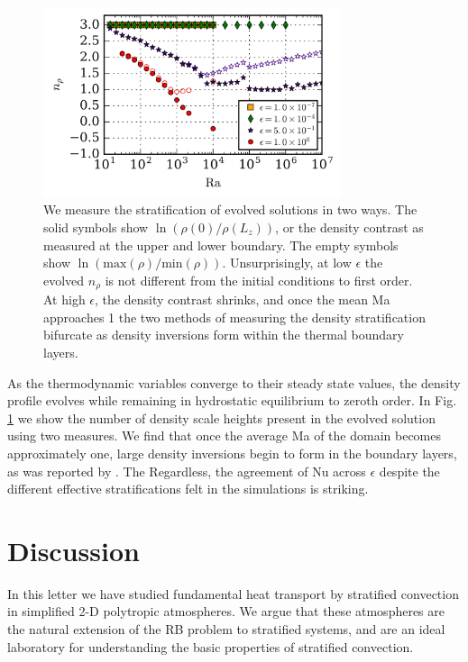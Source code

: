 \documentclass[aps, prl, twocolumn, nofootinbib, groupedaddress, amsfonts, amssymb, amsmath]{revtex4-1}
\begin{document}
\begin{figure}[t]
\includegraphics[width=3.4375in]{./figs/density_v_ra.png}
\caption{\label{fig:nrho_v_ra} We measure the stratification of evolved solutions
in two ways.  The solid symbols show $\ln(\rho(0)/\rho(L_z))$, or the density contrast
as measured at the upper and lower boundary.  The empty symbols show 
$\ln(\text{max}(\rho)/\text{min}(\rho))$. Unsurprisingly, at low $\epsilon$ the evolved
$n_{\rho}$ is not different from the initial conditions to first order.  At high $\epsilon$,
the density contrast shrinks, and once the mean Ma approaches 1 the two methods of
measuring the density stratification bifurcate as density inversions form within the thermal
boundary layers.}
\end{figure}

As the thermodynamic variables converge to their steady state values, the density
profile evolves while remaining in hydrostatic equilibrium to zeroth order.  In 
Fig. \ref{fig:nrho_v_ra} we show the number of density scale heights present in the
evolved solution using two measures.  We find that once the average Ma of the domain
becomes approximately one, large density inversions begin to form in the boundary layers,
as was reported by \cite{brandenburg&all2005}.  The Regardless, the agreement of Nu
across $\epsilon$ despite the different effective stratifications felt in the simulations
is striking.  

\section{Discussion}
\label{sec:discussion}
In this letter we have studied fundamental heat transport by 
stratified convection in simplified 2-D polytropic atmospheres.
We argue that these atmospheres are the natural extension
of the RB problem to stratified systems, 
and are an ideal laboratory for understanding the basic properties of stratified
convection. 
\end{document}
